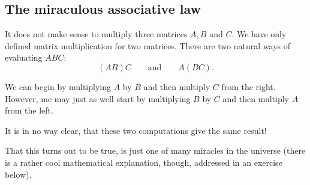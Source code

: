 \documentclass{article}
\begin{document}
\subsection{The miraculous associative law}

It does not make sense to multiply three matrices $A, B$ and $C$. We have only defined
matrix multiplication for two matrices. There are two natural ways of evaluating
$A B C$:
$$
( A B ) C\qquad \text{and}\qquad A (B C).
$$

We can begin by multiplying $A$ by $B$ and then multiply $C$ from the right.
However, me may just as well start by multiplying $B$ by $C$ and then
multiply $A$ from the left.

It is in no way clear, that these two computations give the same result!

That this turns out to be true, is just one of many miracles in the universe (there is a
rather cool mathematical explanation, though, addressed in an exercise below).
\end{document}
